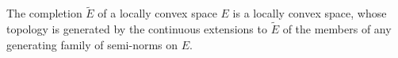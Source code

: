 The completion $\tilde{E}$ of a locally convex space $E$ is a locally convex space, whose topology is generated by the continuous extensions to $\tilde{E}$ of the members of any generating family of semi-norms on $E$.
